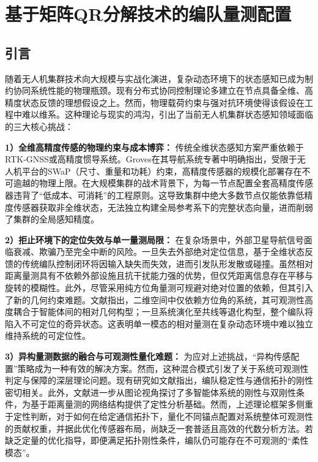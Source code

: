 \chapter{基于矩阵QR分解技术的编队量测配置}

\section{引言}
随着无人机集群技术向大规模与实战化演进，复杂动态环境下的状态感知已成为制约协同系统性能的物理瓶颈。现有分布式协同控制理论多建立在节点具备全维、高精度状态反馈的理想假设之上。然而，物理载荷约束与强对抗环境使得该假设在工程中难以维系。这种理论与现实的鸿沟，引出了当前无人机集群状态感知领域面临的三大核心挑战：

\textbf{1）全维高精度传感的物理约束与成本博弈：} 
传统全维状态感知方案严重依赖于RTK-GNSS或高精度惯导系统。Groves\cite{2015gnss与惯性及多传感器组合导航系统原理}在其导航系统专著中明确指出，受限于无人机平台的SWaP（尺寸、重量和功耗）约束，高精度传感器的规模化部署存在不可逾越的物理上限。在大规模集群的战术背景下，为每一节点配置全套高精度传感器违背了“低成本、可消耗”的工程原则。这导致集群中绝大多数节点仅能依靠低精度传感器获取非全维状态，无法独立构建全局参考系下的完整状态向量，进而削弱了集群的全局感知精度。

\textbf{2）拒止环境下的定位失效与单一量测局限：} 
在复杂场景中，外部卫星导航信号面临衰减、欺骗乃至完全中断的风险。一旦失去外部绝对定位信息，基于全维状态反馈的传统编队控制闭环将因输入缺失而失效，进而引发队形发散或碰撞。虽然相对距离量测具有不依赖外部设施且抗干扰能力强的优势，但仅凭距离信息存在平移与旋转的模糊性。此外，尽管采用纯方位角量测可规避对绝对位置的依赖，但其引入了新的几何约束难题。文献\parencite{CHEN2022110605}指出，二维空间中仅依赖方位角的系统，其可观测性高度耦合于智能体间的相对几何构型；一旦系统演化至共线等退化构型，整个编队将陷入不可定位的奇异状态。这表明单一模态的相对量测在复杂动态环境中难以独立维持系统的可定位性。

\textbf{3）异构量测数据的融合与可观测性量化难题：} 为应对上述挑战，“异构传感配置”策略成为一种有效的解决方案。然而，这种混合模式引发了关于系统可观测性判定与保障的深层理论问题。现有研究如文献\parencite{1025347369.nh}指出，编队稳定性与通信拓扑的刚性密切相关。此外，文献\parencite{10197184}进一步从图论视角探讨了多智能体系统的刚性与双刚性条件，为基于距离量测的网络结构提供了定性分析基础。然而，上述理论框架多侧重于定性判断，对于如何在给定通信拓扑下，量化不同锚点配置对系统整体可观测性的贡献权重，并据此优化传感器布局，尚缺乏一套普适且高效的代数分析方法。若缺乏定量的优化指导，即便满足拓扑刚性条件，编队仍可能存在不可观测的“柔性模态”。

